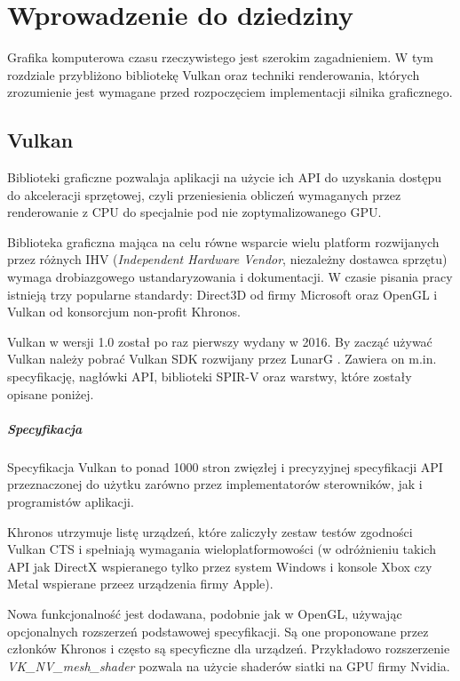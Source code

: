 \chapter{Wprowadzenie do dziedziny}
\label{chap:field}

Grafika komputerowa czasu rzeczywistego jest szerokim zagadnieniem.
W tym rozdziale przybliżono bibliotekę Vulkan oraz techniki renderowania, których zrozumienie jest wymagane przed rozpoczęciem implementacji silnika graficznego.

\section{Vulkan}

Biblioteki graficzne pozwalaja aplikacji na użycie ich API do uzyskania dostępu do akceleracji sprzętowej, czyli przeniesienia obliczeń wymaganych przez renderowanie z CPU do specjalnie pod nie zoptymalizowanego GPU.

Biblioteka graficzna mająca na celu równe wsparcie wielu platform rozwijanych przez różnych IHV (\textit{Independent Hardware Vendor}, niezależny dostawca sprzętu) wymaga drobiazgowego ustandaryzowania i dokumentacji.
W czasie pisania pracy istnieją trzy popularne standardy: Direct3D od firmy Microsoft oraz OpenGL i Vulkan od konsorcjum non-profit Khronos.

Vulkan w wersji 1.0 został po raz pierwszy wydany w 2016. By zacząć używać Vulkan należy pobrać Vulkan SDK rozwijany przez LunarG \cite{VULKANSDK}.
Zawiera on m.in. specyfikację, nagłówki API, biblioteki SPIR-V oraz warstwy, które zostały opisane poniżej.

\paragraph{Specyfikacja}

Specyfikacja Vulkan \cite{VULKANSPEC} to ponad 1000 stron zwięzłej i precyzyjnej specyfikacji API przeznaczonej do użytku zarówno przez implementatorów sterowników, jak i programistów aplikacji.

Khronos utrzymuje listę urządzeń, które zaliczyły zestaw testów zgodności Vulkan CTS \cite{VULKANCTS} i spełniają wymagania wieloplatformowości (w odróżnieniu takich API jak DirectX wspieranego tylko przez system Windows i konsole Xbox \cite{HughesDamEtAl13} czy Metal wspierane przeez urządzenia firmy Apple).

Nowa funkcjonalność jest dodawana, podobnie jak w OpenGL, używając opcjonalnych rozszerzeń podstawowej specyfikacji. Są one proponowane przez członków Khronos i często są specyficzne dla urządzeń.
Przykładowo rozszerzenie \textit{VK\_NV\_mesh\_shader} pozwala na użycie shaderów siatki na GPU firmy Nvidia.

